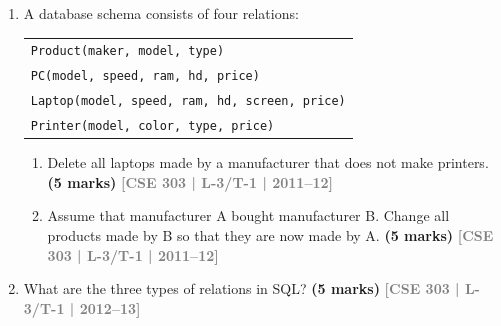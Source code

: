\documentclass[12pt,a3paper]{article}
\newcommand{\yr}[1]{\hfill\textcolor{gray}{\small\textbf{[#1]}}}
\newcommand{\mk}[1]{\textcolor{orange!70!black}{\small\textbf{(#1 marks)}}}
\begin{document}
\begin{enumerate}
Write SQL statements to answer the following queries:
\begin{enumerate}
  \item For each city, how many projects are located in that city and what is the total budget over all projects in the city?
  \item For each project, what fraction of the budget is spent (in total) on salaries for the people working on that project? Sort your answer by the value of the budget.
  \item Remove the work assignment of all persons to any projects for which more than 2 persons share the same responsibility.
  \item List all projects located in Toronto city and include for each one the number of persons working on the project.
  \item Find the names of projects whose budgets are greater than all projects located in Waterloo city.
\end{enumerate}
\mk{25} \yr{CSE 303 | L-3/T-1 | 2011--12}

\item A database schema consists of four relations:
\begin{center}
\begin{tabular}{l}
\texttt{Product(maker, model, type)}\\
\texttt{PC(model, speed, ram, hd, price)}\\
\texttt{Laptop(model, speed, ram, hd, screen, price)}\\
\texttt{Printer(model, color, type, price)}
\end{tabular}
\end{center}

\begin{enumerate}
\item  Delete all laptops made by a manufacturer that does not make printers.
\mk{5} \yr{CSE 303 | L-3/T-1 | 2011--12}

\item Assume that manufacturer A bought manufacturer B. Change all products made by B so that they are now made by A.
\mk{5} \yr{CSE 303 | L-3/T-1 | 2011--12}
\end{enumerate}
\item What are the three types of relations in SQL?
\mk{5} \yr{CSE 303 | L-3/T-1 | 2012--13}


\end{enumerate}
\end{document}
